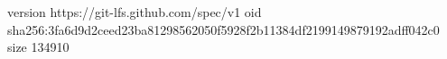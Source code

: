version https://git-lfs.github.com/spec/v1
oid sha256:3fa6d9d2ceed23ba81298562050f5928f2b11384df2199149879192adff042c0
size 134910
